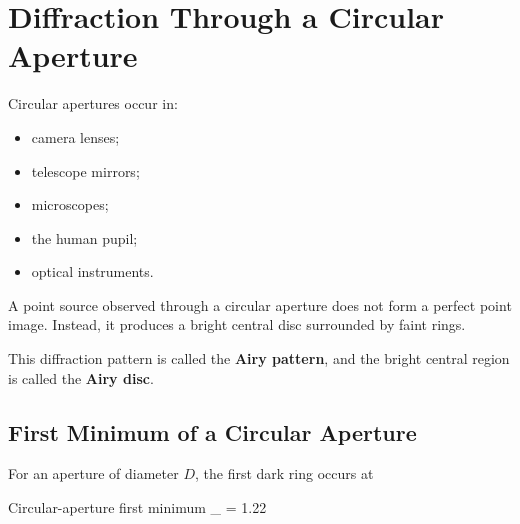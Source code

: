 \documentclass{studentnotes}
\begin{document}
\begin{center}
\end{center}

\section{Diffraction Through a Circular Aperture}

Circular apertures occur in:

\begin{itemize}
    \item camera lenses;
    \item telescope mirrors;
    \item microscopes;
    \item the human pupil;
    \item optical instruments.
\end{itemize}

A point source observed through a circular aperture does not form a perfect point image. Instead, it produces a bright central disc surrounded by faint rings.

This diffraction pattern is called the \textbf{Airy pattern}, and the bright central region is called the \textbf{Airy disc}.

\subsection{First Minimum of a Circular Aperture}

For an aperture of diameter \(D\), the first dark ring occurs at

\begin{namedformula}{Circular-aperture first minimum}
    \sin\theta_{\min}
    =
    1.22
\end{namedformula}
\end{document}
